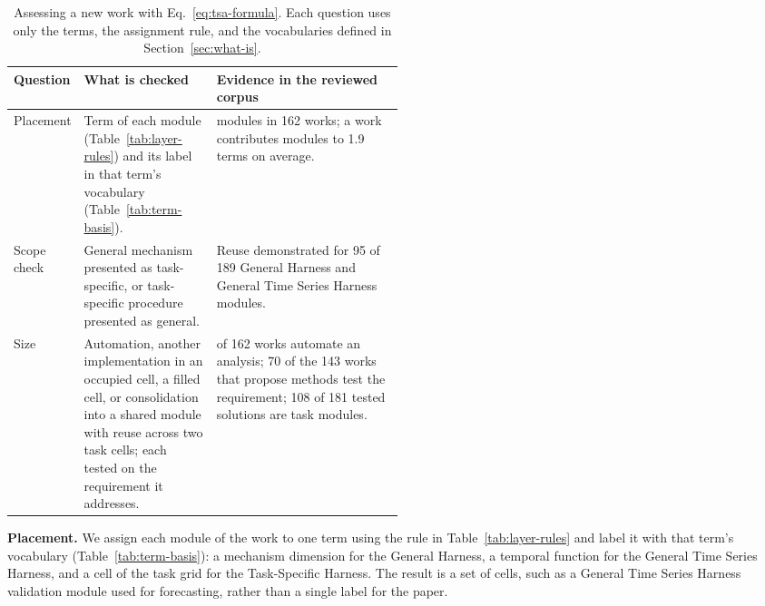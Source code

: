 \documentclass[preprints,article,submit,moreauthors]{Definitions/mdpi}
\begin{document}
\begin{table}[t]
\centering\footnotesize
\setlength{\tabcolsep}{4pt}
\renewcommand{\arraystretch}{1.15}
\renewcommand{\tabularxcolumn}[1]{p{#1}}
\begin{tabularx}{\linewidth}{@{}>{\raggedright\arraybackslash}p{0.16\linewidth}>{\raggedright\arraybackslash}p{0.34\linewidth}>{\raggedright\arraybackslash}X@{}}
\toprule
\textbf{Question} & \textbf{What is checked} & \textbf{Evidence in the reviewed corpus}\\
\midrule
Placement & Term of each module (Table~\ref{tab:layer-rules}) and its label in that term's vocabulary (Table~\ref{tab:term-basis}). & 604 modules in 162 works; a work contributes modules to 1.9 terms on average.\\
Scope check & General mechanism presented as task-specific, or task-specific procedure presented as general. & Reuse demonstrated for 95 of 189 General Harness and General Time Series Harness modules.\\
Size & Automation, another implementation in an occupied cell, a filled cell, or consolidation into a shared module with reuse across two task cells; each tested on the requirement it addresses. & 136 of 162 works automate an analysis; 70 of the 143 works that propose methods test the requirement; 108 of 181 tested solutions are task modules.\\
\bottomrule
\end{tabularx}
\caption{Assessing a new work with Eq.~\eqref{eq:tsa-formula}. Each question uses only the terms, the assignment rule, and the vocabularies defined in Section~\ref{sec:what-is}.}
\label{tab:assessment}
\end{table}

\noindent\textbf{Placement.} We assign each module of the work to one term using the rule in Table~\ref{tab:layer-rules} and label it with that term's vocabulary (Table~\ref{tab:term-basis}): a mechanism dimension for the General Harness, a temporal function for the General Time Series Harness, and a cell of the task grid for the Task-Specific Harness. The result is a set of cells, such as a General Time Series Harness validation module used for forecasting, rather than a single label for the paper.
\end{document}
